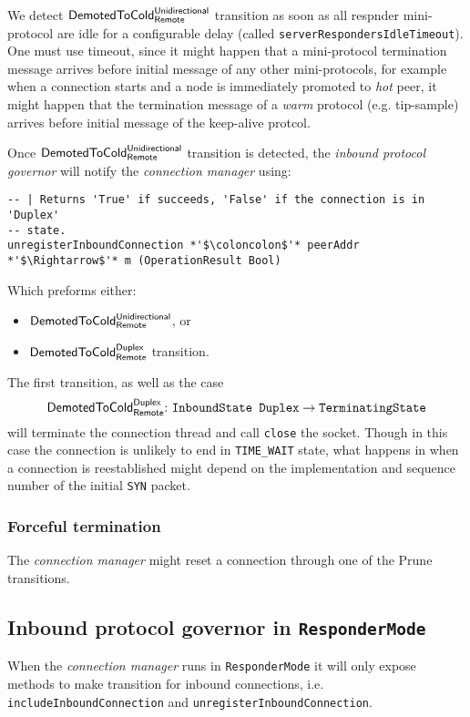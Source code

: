 \documentclass{article}
\def\InboundStateDup{\texttt{InboundState Duplex}}
\def\TerminatingState{\texttt{TerminatingState}}
\def\DemotedToColdDupRem{$\text{\textsf{DemotedToCold}}^\text{\textsf{Duplex}}_\text{\textsf{Remote}}$}
\def\DemotedToColdUniRem{$\text{\textsf{DemotedToCold}}^\text{\textsf{Unidirectional}}_\text{\textsf{Remote}}$}
\def\Prune{\textsf{Prune}}
\def\warm{\textit{warm}}
\def\hot{\textit{hot}}
\def\keepAlive{\textsf{keep-alive}}
\def\tipSample{\textsf{tip-sample}}
\def\inbgov{\textit{inbound protocol governor}}
\def\connmngr{\textit{connection manager}}
\begin{document}
We detect \DemotedToColdUniRem{} transition as soon as all respnder
mini-protocol are idle for a configurable delay (called
\texttt{serverRespondersIdleTimeout}).  One must use timeout, since it might
happen that a mini-protocol termination message arrives before initial message
of any other mini-protocols, for example when a connection starts and a node is
immediately promoted to \hot{} peer, it might happen that the termination message of
a \warm{} protocol (e.g. \tipSample{}) arrives before initial message of
the \keepAlive{} protcol.

Once \DemotedToColdUniRem{} transition is detected, the \inbgov{} will notify
the \connmngr{} using:

\begin{lstlisting}
-- | Returns 'True' if succeeds, 'False' if the connection is in 'Duplex'
-- state.
unregisterInboundConnection *'$\coloncolon$'* peerAddr *'$\Rightarrow$'* m (OperationResult Bool)
\end{lstlisting}
Which preforms either:
\begin{itemize}
  \item \DemotedToColdUniRem{}, or
  \item \DemotedToColdDupRem{} transition.
\end{itemize}
The first transition, as well as the case
\[
  \text{\DemotedToColdDupRem:\ \InboundStateDup{}}\rightarrow\text{\TerminatingState{}}
\]
will terminate the connection thread and call \texttt{close} the socket.
Though in this case the connection is unlikely to end in \texttt{TIME\_WAIT}
state, what happens in when a connection is reestablished might depend on the
implementation and sequence number of the initial \texttt{SYN}
packet\cite[Chapter 2, \texttt{TIME\_WAIT} section]{stevens2003unix}.

\subsubsection{Forceful termination}
The \connmngr{} might reset a connection through one of the \Prune{}
transitions.

\subsection{Inbound protocol governor in \texttt{ResponderMode}}
When the \connmngr{} runs in \texttt{ResponderMode} it will only expose
methods to make transition for inbound connections, i.e.
\texttt{includeInboundConnection} and \texttt{unregisterInboundConnection}.
\end{document}
